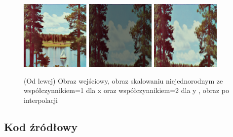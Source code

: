 \documentclass[final,a4paper,openany,12pt]{mwbk}
\begin{document}
\begin{figure}[H]
	\begin{center}
		\includegraphics[width=0.3\textwidth]{2/2Geo_ScaleNJ_Original}
		\includegraphics[width=0.3\textwidth]{2/2Geo_ScaleNJ_Result}
		\includegraphics[width=0.3\textwidth]{2/2Geo_ScaleNJ_Result_Interp}
	\end{center}
	\caption{(Od lewej) Obraz wejściowy, obraz skalowaniu niejednorodnym ze współczynnikiem=1 dla x oraz współczynnikiem=2 dla y , obraz po interpolacji }
\end{figure}

\subsection*{Kod źródłowy}
\end{document}
